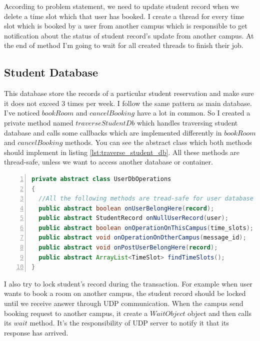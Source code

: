 \documentclass[12pt]{article}
\begin{document}
\par According to problem statement, we need to update student record when we delete a time slot which that user has booked. I create a thread for every time slot which is booked by a user from another campus which is responsible to get notification about the status of student record's update from another campus. At the end of method I'm going to wait for all created threads to finish their job.

\subsection{Student Database}
This database store the records of a particular student reservation and make sure it does not exceed 3 times per week. I follow the same pattern as main database. I've noticed $bookRoom$ and $cancelBooking$ have a lot in common. So I created a private method named $traverseStudentDb$ which handles traversing student database and calls some callbacks which are implemented differently in $bookRoom$ and $cancelBooking$ methods. You can see the abstract class which both methods should implement in listing \ref{lst:traverse_student_db}. All these methods are thread-safe, unless we want to access another database or container.

\begin{lstlisting}[language=java,label={lst:traverse_student_db},caption={UserDbOperations Abstract Class},numbers=left]
private abstract class UserDbOperations
{
  //All the following methods are tread-safe for user database
  public abstract boolean onUserBelongHere(record);
  public abstract StudentRecord onNullUserRecord(user);
  public abstract boolean onOperationOnThisCampus(time_slots);
  public abstract void onOperationOnOtherCampus(message_id); 
  public abstract void onPostUserBelongHere(record);
  public abstract ArrayList<TimeSlot> findTimeSlots();
}
\end{lstlisting}

\par I also try to lock student's record during the transaction. For example when user wants to book a room on another campus, the student record should be locked until we receive answer through UDP communication. When the campus send booking request to another campus, it create a $WaitObject$ object and then calls its $wait$ method. It's the responsibility of UDP server to notify it that its response has arrived.
\end{document}
